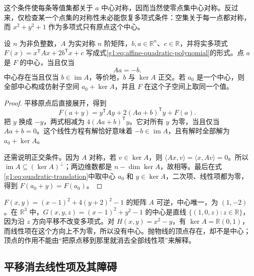 这个条件使每条等值集都关于 \(a\) 中心对称，因而当然使零点集中心对称。反过来，仅检查某一个点集的对称性未必能恢复多项式条件：空集关于每一点都对称，而 \(x^2+y^2+1\) 作为多项式只有原点这个中心。

\begin{proposition}
	\label{g1:prop:quadric-center}
	设 \(n\) 为非负整数，\(A\) 为实对称 \(n\) 阶矩阵，\(b,a\in\mathbb R^n\)、\(c\in\mathbb R\)，并将实多项式 \(F(x)=x^{\mathsf T}Ax+2b^{\mathsf T}x+c\) 写成式\eqref{g1:eq:affine-quadratic-polynomial}的形式。点 \(a\) 是 \(F\) 的中心，当且仅当
	\[
		Aa=-b.
	\]
	中心存在当且仅当 \(b\in\operatorname{im}A\)，等价地，\(b\) 与 \(\ker A\) 正交。若 \(a_0\) 是一个中心，则全部中心构成仿射子空间 \(a_0+\ker A\)，并且 \(F\) 在这个子空间上取同一个值。
\end{proposition}

\begin{proof}
	平移原点后直接展开，得到
	\begin{equation}
		\label{g1:eq:quadratic-translation}
		F(a+y)=y^{\mathsf T}Ay+2(Aa+b)^{\mathsf T}y+F(a).
	\end{equation}
	把 \(y\) 换成 \(-y\)，两式相减为 \(4(Aa+b)^{\mathsf T}y\)。它对所有 \(y\) 为零，当且仅当 \(Aa+b=0\)。这个线性方程有解恰好意味着 \(-b\in\operatorname{im}A\)，且有解时全部解为 \(a_0+\ker A\)。

	还需说明正交条件。因为 \(A\) 对称，若 \(v\in\ker A\)，则 \(\langle Ax,v\rangle=\langle x,Av\rangle=0\)。所以 \(\operatorname{im}A\subseteq(\ker A)^\perp\)；两边维数都是 \(n-\dim\ker A\)，故相等。最后在式\eqref{g1:eq:quadratic-translation}中取中心 \(a_0\) 和 \(y\in\ker A\)，二次项、线性项都为零，得到 \(F(a_0+y)=F(a_0)\)。
\end{proof}

\begin{example}
	\label{g1:exm:quadric-centers}
	\(F(x,y)=(x-1)^2+4(y+2)^2-1\) 的矩阵 \(A\) 可逆，中心唯一，为 \((1,-2)\)。在 \(\mathbb R^3\) 中，\(G(x,y,z)=(x-1)^2+y^2-1\) 的中心是直线 \(\{(1,0,z):z\in\mathbb R\}\)，因为沿 \(z\) 方向平移不改变多项式。对 \(H(x,y)=x^2-y\)，有 \(\ker A=\mathbb R(0,1)\)，而线性项在这个方向上不为零，所以没有中心。抛物线的顶点存在，却不是中心；顶点的作用不能由“把原点移到那里就消去全部线性项”来解释。
\end{example}

\subsection{平移消去线性项及其障碍}
\label{g1:subsec:0202:02}

